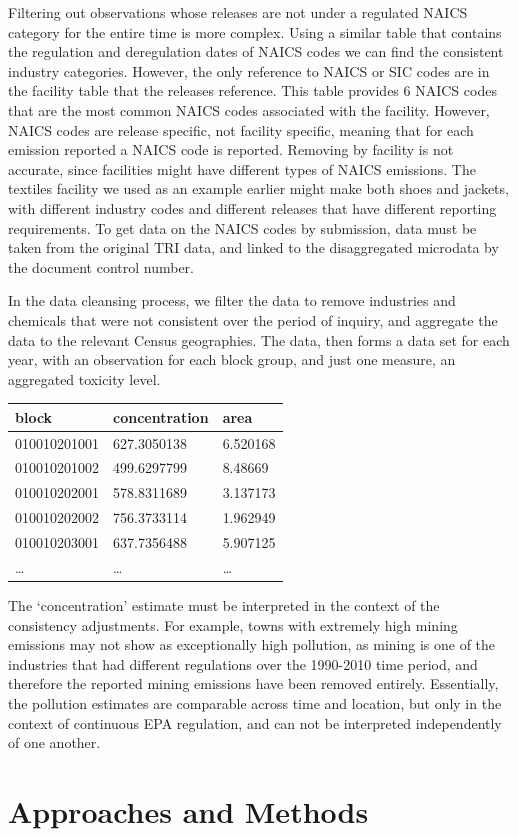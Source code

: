 \documentclass[12pt,twoside]{dukestatscithesis}
\theoremstyle{definition}
\theoremstyle{definition}
\theoremstyle{definition}
\theoremstyle{remark}
\begin{document}
Filtering out observations whose releases are not under a regulated
NAICS category for the entire time is more complex. Using a similar
table that contains the regulation and deregulation dates of NAICS codes
we can find the consistent industry categories. However, the only
reference to NAICS or SIC codes are in the facility table that the
releases reference. This table provides 6 NAICS codes that are the most
common NAICS codes associated with the facility. However, NAICS codes
are release specific, not facility specific, meaning that for each
emission reported a NAICS code is reported. Removing by facility is not
accurate, since facilities might have different types of NAICS
emissions. The textiles facility we used as an example earlier might
make both shoes and jackets, with different industry codes and different
releases that have different reporting requirements. To get data on the
NAICS codes by submission, data must be taken from the original TRI
data, and linked to the disaggregated microdata by the document control
number.

In the data cleansing process, we filter the data to remove industries
and chemicals that were not consistent over the period of inquiry, and
aggregate the data to the relevant Census geographies. The data, then
forms a data set for each year, with an observation for each block
group, and just one measure, an aggregated toxicity level.
\begin{longtable}[]{@{}lll@{}}
\toprule
block & concentration & area\tabularnewline
\midrule
\endhead
010010201001 & 627.3050138 & 6.520168\tabularnewline
010010201002 & 499.6297799 & 8.48669\tabularnewline
010010202001 & 578.8311689 & 3.137173\tabularnewline
010010202002 & 756.3733114 & 1.962949\tabularnewline
010010203001 & 637.7356488 & 5.907125\tabularnewline
\ldots{} & \ldots{} & \ldots{}\tabularnewline
\bottomrule
\end{longtable}
The `concentration' estimate must be interpreted in the context of the
consistency adjustments. For example, towns with extremely high mining
emissions may not show as exceptionally high pollution, as mining is one
of the industries that had different regulations over the 1990-2010 time
period, and therefore the reported mining emissions have been removed
entirely. Essentially, the pollution estimates are comparable across
time and location, but only in the context of continuous EPA regulation,
and can not be interpreted independently of one another.

\chapter{Approaches and Methods}\label{ref-labels}
\end{document}
